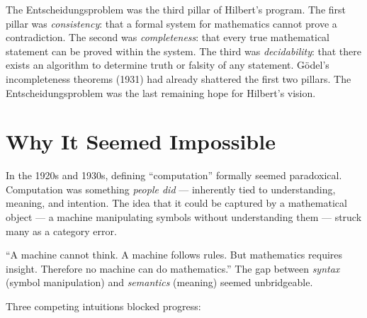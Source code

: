 The Entscheidungsproblem was the third pillar of Hilbert's program. The first pillar was \emph{consistency}: that a formal system for mathematics cannot prove a contradiction. The second was \emph{completeness}: that every true mathematical statement can be proved within the system. The third was \emph{decidability}: that there exists an algorithm to determine truth or falsity of any statement. G\"odel's incompleteness theorems (1931) had already shattered the first two pillars. The Entscheidungsproblem was the last remaining hope for Hilbert's vision.

\section{Why It Seemed Impossible}
\label{sec:computation:impossible}

In the 1920s and 1930s, defining ``computation'' formally seemed paradoxical. Computation was something \emph{people did} --- inherently tied to understanding, meaning, and intention. The idea that it could be captured by a mathematical object --- a machine manipulating symbols without understanding them --- struck many as a category error.

``A machine cannot think. A machine follows rules. But mathematics requires insight. Therefore no machine can do mathematics.'' The gap between \emph{syntax} (symbol manipulation) and \emph{semantics} (meaning) seemed unbridgeable.

Three competing intuitions blocked progress:

